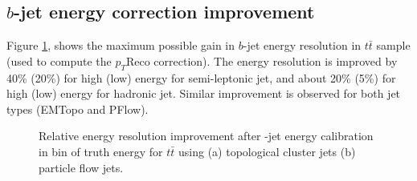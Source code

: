\subsection{$b$-jet energy correction improvement}
\label{Jet:Cal:BCal:Result}
Figure \ref{fig:Jet:Cal:BCal:Result:E}, shows the maximum possible gain in $b$-jet energy resolution in $t\bar{t}$ sample (used to compute the $p_{T}$Reco correction). The energy resolution is improved by 40\% (20\%) for high (low) energy for semi-leptonic jet, and about 20\% (5\%) for high (low) energy for hadronic jet. Similar improvement is observed for both jet types (EMTopo and PFlow).
\begin{figure}[htbp]
   \centering
   \quad
   \begin{tcolorbox}[colback=black!5!white,colframe=white!75!black]
   \caption{Relative energy resolution improvement after \bq-jet energy calibration in bin of truth energy for $t\bar{t}$ using (a) topological cluster jets (b) particle flow jets.}
    \label{fig:Jet:Cal:BCal:Result:E}
   \end{tcolorbox}

\end{figure}

